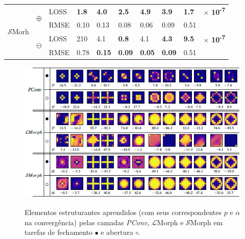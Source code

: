 \begin{table}
{\begin{tabular}{*{10}l}
            \hline
            \hline
            \multirow{4}{*}{$\mathcal{S}$Morh} & \multirow{2}{*}{$\oplus$}  & LOSS & \textbf{1.8}  & \textbf{4.0} & \textbf{2.5} & \textbf{4.9} & \textbf{3.9} & \textbf{1.7} & $\times$ \textbf{10\textsuperscript{-7}} \\
            &                            & RMSE & 0.10          & 0.13          & 0.08          & 0.06          & 0.09            & 0.51           &                                          \\
            \cline{3-10}
            & \multirow{2}{*}{$\ominus$} & LOSS & 210           & 4.1           & \textbf{0.8}  & 4.1           & \textbf{4.3}    & \textbf{9.5} & $\times$ \textbf{10\textsuperscript{-7}} \\
            &                            & RMSE & 0.78          & \textbf{0.15} & \textbf{0.09} & \textbf{0.05} & \textbf{0.09}   & 0.51           &                                          \\
            \hline
        \end{tabular}
    }
\end{table}


\begin{figure}
    \caption{Elementos estruturantes aprendidos (com seus correspondentes $p$ e $\alpha$ na convergência) pelas camadas \emph{PConv}, $\mathcal{L}$Morph e $\mathcal{S}$Morph em tarefas de fechamento $\bullet$ e abertura $\circ$.}
    \centering
    \includegraphics[scale=0.9]{images/ElementosEstrurantesAprendidos2}
    \label{fig:elementos-estruturantes-aprendidos-2}
\end{figure}

